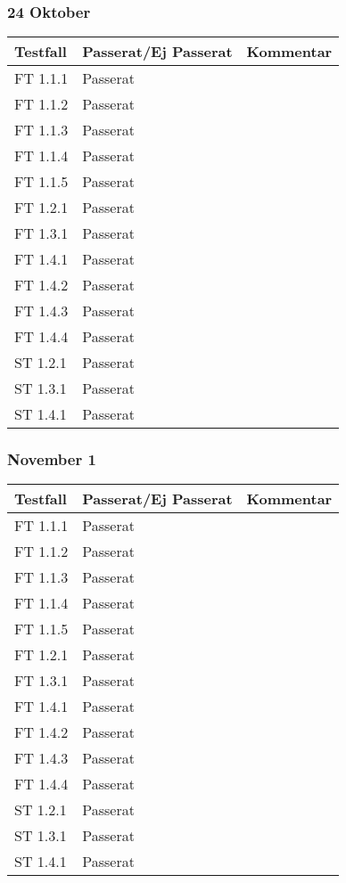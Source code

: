 \documentclass[a4paper]{article}
\begin{document}
\subsubsection{24 Oktober}
\begin{tabular}{| l | l | p{9cm} |}
\hline
Testfall & Passerat/Ej Passerat & Kommentar\\
\hline
FT 1.1.1 & Passerat & \\
\hline
FT 1.1.2 & Passerat & \\
\hline
FT 1.1.3 & Passerat & \\
\hline
FT 1.1.4 & Passerat & \\
\hline
FT 1.1.5 & Passerat & \\
\hline
FT 1.2.1 & Passerat & \\
\hline
FT 1.3.1 & Passerat & \\
\hline
FT 1.4.1 & Passerat & \\
\hline
FT 1.4.2 & Passerat & \\
\hline
FT 1.4.3 & Passerat & \\
\hline
FT 1.4.4 & Passerat & \\
\hline
ST 1.2.1 & Passerat & \\
\hline
ST 1.3.1 & Passerat & \\
\hline
ST 1.4.1 & Passerat & \\
\hline
\end{tabular}

\subsubsection{November 1}
\begin{tabular}{| l | l | p{9cm} |}
\hline
Testfall & Passerat/Ej Passerat & Kommentar\\
\hline
FT 1.1.1 & Passerat & \\
\hline
FT 1.1.2 & Passerat & \\
\hline
FT 1.1.3 & Passerat & \\
\hline
FT 1.1.4 & Passerat & \\
\hline
FT 1.1.5 & Passerat & \\
\hline
FT 1.2.1 & Passerat & \\
\hline
FT 1.3.1 & Passerat & \\
\hline
FT 1.4.1 & Passerat & \\
\hline
FT 1.4.2 & Passerat & \\
\hline
FT 1.4.3 & Passerat & \\
\hline
FT 1.4.4 & Passerat & \\
\hline
ST 1.2.1 & Passerat & \\
\hline
ST 1.3.1 & Passerat & \\
\hline
ST 1.4.1 & Passerat & \\
\hline
\end{tabular}
\end{document}
